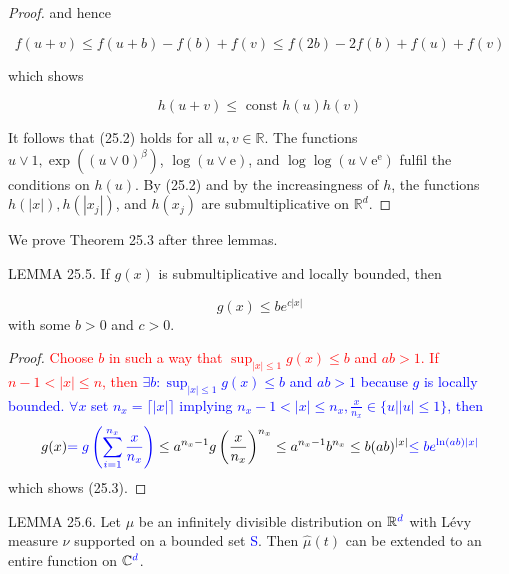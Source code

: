 \documentclass[a4paper,11pt]{article}
\begin{document}
\begin{proof}
    and hence

    $$
        f(u+v) \leq f(u+b)-f(b)+f(v) \leq f(2 b)-2 f(b)+f(u)+f(v)
    $$

    which shows


    \begin{equation*}
        h(u+v) \leq \text { const } h(u) h(v) \tag{25.2}
    \end{equation*}


    It follows that (25.2) holds for all $u, v \in \mathbb{R}$. The functions
    $u \vee 1, \exp \left((u \vee 0)^{\beta}\right)$, $\log (u \vee \mathrm{e})$, and
    $\log \log \left(u \vee \mathrm{e}^{\mathrm{e}}\right)$ fulfil the conditions on
    $h(u)$. By (25.2) and by the increasingness of $h$, the functions $h(|x|), h\left(\left|x_{j}\right|\right)$, and
    $h\left(x_{j}\right)$ are submultiplicative on $\mathbb{R}^{d}$.

\end{proof}

We prove Theorem 25.3 after three lemmas.

LEMMA 25.5. If $g(x)$ is submultiplicative and locally bounded, then

\begin{equation*}
    g(x) \leq b e^{c|x|} \tag{25.3}
\end{equation*}
with some $b>0$ and $c>0$.

\begin{proof}
    \textcolor{red}{
        Choose $b$ in such a way that $\sup _{|x| \leq 1} g(x) \leq b$ and $a b>1$. If $n-1<|x| \leq n$,
        then
    }
    \textcolor{blue}{
        $\exists b: \sup _{|x| \leq 1} g(x) \leq b$ and $a b>1$ because $g$ is locally bounded.
        $\forall x$ set $n_x = \lceil \left| x \right| \rceil$ implying $n_x-1 < \left| x \right| \leq n_x, \frac{x}{n_x} \in \{u | |u| \leq 1\} $, then
    }
    $$
        g(x)
        \textcolor{blue}{
            = g\left(\sum_{i=1}^{n_x} \frac{x}{n_x}\right)
        }
        \leq a^{n_x-1} g\left(\frac{x}{n_x} \right)^{n_x} \leq a^{n_x-1} b^{n_x} \leq b(a b)^{|x|}
        \textcolor{blue}{
            \le b e^{\ln \left(ab\right)|x|}
        }
    $$
    which shows (25.3).
\end{proof}

LEMMA 25.6. Let $\mu$ be an infinitely divisible distribution on $\mathbb{R} \textcolor{blue}{^{d}}$ with Lévy measure $\nu$
supported on a bounded set \textcolor{blue}{S}. Then $\widehat{\mu}(t)$ can be extended to an entire function on $\mathbb{C}\textcolor{blue}{^{d}}$.
\end{document}

